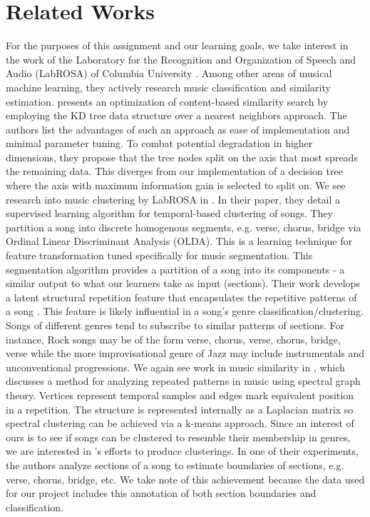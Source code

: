\documentclass[11pt, twocolumn]{article}
\begin{document}
\section{Related Works}
    For the purposes of this assignment and our learning goals, we take
interest in the work of the Laboratory for the Recognition and Organization of
Speech and Audio (LabROSA) of Columbia University \cite{labrosa}. Among other
areas of musical machine learning, they actively research music classification
and similarity estimation. \cite{similarity} presents an optimization of
content-based similarity search by employing the KD tree data structure over a
nearest neighbors approach. The authors list the advantages of such an approach
as ease of implementation and minimal parameter tuning. To combat potential
degradation in higher dimensions, they propose that the tree nodes split on the
axis that most spreads the remaining data. This diverges from our
implementation of a decision tree where the axis with maximum information gain
is selected to split on.
    We see research into music clustering by LabROSA in \cite{olda}. In their
paper, they detail a supervised learning algorithm for temporal-based
clustering of songs. They partition a song into discrete homogenous segments,
e.g. verse, chorus, bridge via Ordinal Linear Discriminant Analysis (OLDA).
This is a learning technique for feature transformation tuned specifically for
music segmentation. This segmentation algorithm provides a partition of a song
into its components - a similar output to what our learners take as input
(sections). Their work develops a latent structural repetition feature that
encapsulates the repetitive patterns of a song \cite{olda}. This feature is
likely influential in a song’s genre classification/clustering. Songs of
different genres tend to subscribe to similar patterns of sections. For
instance, Rock songs may be of the form verse, chorus, verse, chorus, bridge,
verse while the more improvisational genre of Jazz may include instrumentals
and unconventional progressions.
    We again see work in music similarity in \cite{structure}, which discusses
a method for analyzing repeated patterns in music using spectral graph theory.
Vertices represent temporal samples and edges mark equivalent position in a
repetition. The structure is represented internally as a Laplacian matrix so
spectral clustering can be achieved via a k-means approach. Since an interest
of ours is to see if songs can be clustered to resemble their membership in
genres, we are interested in \cite{structure}’s efforts to produce
clusterings. In one of their experiments, the authors analyze sections of a
song to estimate boundaries of sections, e.g. verse, chorus, bridge, etc. We
take note of this achievement because the data used for our project includes
this annotation of both section boundaries and classification.
\end{document}
